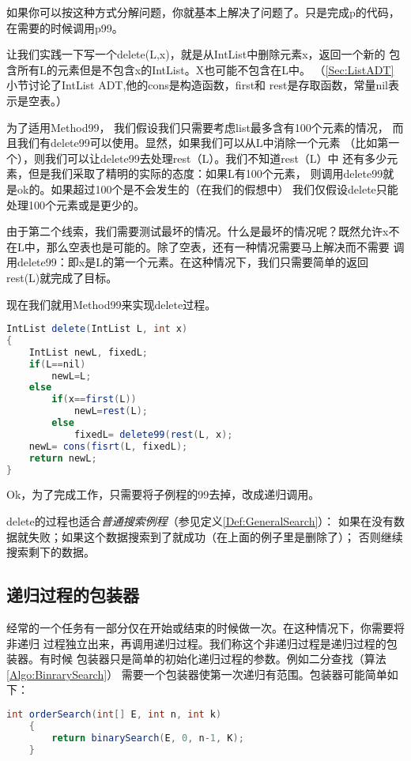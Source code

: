 如果你可以按这种方式分解问题，你就基本上解决了问题了。只是完成p的代码，
在需要的时候调用p99。

让我们实践一下写一个delete(L,x)，就是从IntList中删除元素x，返回一个新的
包含所有L的元素但是不包含x的IntList。X也可能不包含在L中。
（\ref{Sec:ListADT}小节讨论了IntList ADT,他的cons是构造函数，first和
rest是存取函数，常量nil表示是空表。）

为了适用Method99， 我们假设我们只需要考虑list最多含有100个元素的情况，
而且我们有delete99可以使用。显然，如果我们可以从L中消除一个元素
（比如第一个），则我们可以让delete99去处理rest（L）。我们不知道rest（L）中
还有多少元素，但是我们采取了精明的实际的态度：如果L有100个元素，
则调用delete99就是ok的。如果超过100个是不会发生的（在我们的假想中）
我们仅假设delete只能处理100个元素或是更少的。

由于第二个线索，我们需要测试最坏的情况。什么是最坏的情况呢？既然允许x不
在L中，那么空表也是可能的。除了空表，还有一种情况需要马上解决而不需要
调用delete99：即x是L的第一个元素。在这种情况下，我们只需要简单的返回
rest(L)就完成了目标。

现在我们就用Method99来实现delete过程。
\begin{lstlisting}[language={Java},keywordstyle=\color{blue!70}, commentstyle=\color{red!50!green!50!blue!50}]
IntList delete(IntList L, int x)
{
    IntList newL, fixedL;
    if(L==nil)
        newL=L;
    else
        if(x==first(L))
            newL=rest(L);
        else
            fixedL= delete99(rest(L, x);
    newL= cons(fisrt(L, fixedL);
    return newL;
}
\end{lstlisting}
Ok，为了完成工作，只需要将子例程的99去掉，改成递归调用。

delete的过程也适合\emph{普通搜索例程}（参见定义\ref{Def:GeneralSearch}）：
如果在没有数据就失败；如果这个数据搜索到了就成功（在上面的例子里是删除了）；
否则继续搜索剩下的数据。


\subsection{递归过程的包装器}
经常的一个任务有一部分仅在开始或结束的时候做一次。在这种情况下，你需要将非递归
过程独立出来，再调用递归过程。我们称这个非递归过程是递归过程的包装器。有时候
包装器只是简单的初始化递归过程的参数。例如二分查找（算法\ref{Algo:BinrarySearch}）
需要一个包装器使第一次递归有范围。包装器可能简单如下：
\begin{lstlisting}[language={Java},keywordstyle=\color{blue!70}, commentstyle=\color{red!50!green!50!blue!50}]
    int orderSearch(int[] E, int n, int k)
    {
        return binarySearch(E, 0, n-1, K);
    }
\end{lstlisting}


